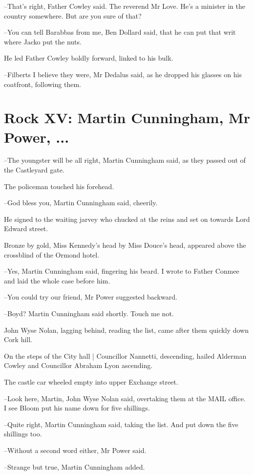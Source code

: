 --That's right,
Father Cowley said.
The reverend Mr Love.
He's a minister
in the country somewhere.
But are you sure of that?

--You can tell Barabbas from me,
Ben Dollard said,
that he can put that writ where Jacko put the nuts.

He led Father Cowley boldly forward,
linked to his bulk.

--Filberts I believe they were,
Mr Dedalus said,
as he dropped his
glasses on his coatfront,
following them.


\section*{Rock XV: Martin Cunningham, Mr Power, ...}


--The youngster will be all right,
Martin Cunningham said,
as they passed
out of the Castleyard gate.

The policeman touched his forehead.

--God bless you,
Martin Cunningham said, cheerily.

He signed to the waiting jarvey
who chucked at the reins and set on towards Lord Edward street.

Bronze by gold,
Miss Kennedy's head by Miss Douce's head,
appeared above
the crossblind of the Ormond hotel.

--Yes,
Martin Cunningham said,
fingering his beard.
I wrote to Father
Conmee and laid the whole case before him.

--You could try our friend,
Mr Power suggested backward.

--Boyd?
Martin Cunningham said shortly.
Touch me not.

John Wyse Nolan, lagging behind, reading the list,
came after them
quickly down Cork hill.

On the steps of the City hall |
Councillor Nannetti, descending,
hailed
Alderman Cowley and Councillor Abraham Lyon ascending.

The castle car wheeled empty into upper Exchange street.

--Look here, Martin,
John Wyse Nolan said,
overtaking them at the MAIL
office.
I see Bloom put his name down for five shillings.

--Quite right,
Martin Cunningham said,
taking the list.
And put down the
five shillings too.

--Without a second word either,
Mr Power said.

--Strange but true,
Martin Cunningham added.

